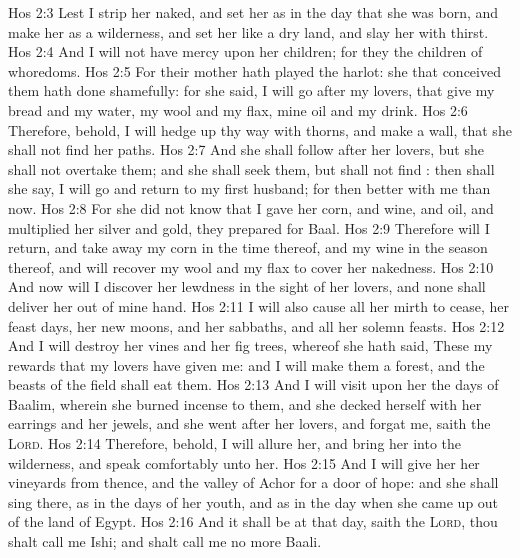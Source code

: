 \vs Hos 2:3 Lest I strip her naked, and set her as in the day that she was born, and make her as a wilderness, and set her like a dry land, and slay her with thirst.
\vs Hos 2:4 And I will not have mercy upon her children; for they  the children of whoredoms.
\vs Hos 2:5 For their mother hath played the harlot: she that conceived them hath done shamefully: for she said, I will go after my lovers, that give  my bread and my water, my wool and my flax, mine oil and my drink.
\vs Hos 2:6 Therefore, behold, I will hedge up thy way with thorns, and make a wall, that she shall not find her paths.
\vs Hos 2:7 And she shall follow after her lovers, but she shall not overtake them; and she shall seek them, but shall not find : then shall she say, I will go and return to my first husband; for then  better with me than now.
\vs Hos 2:8 For she did not know that I gave her corn, and wine, and oil, and multiplied her silver and gold,  they prepared for Baal.
\vs Hos 2:9 Therefore will I return, and take away my corn in the time thereof, and my wine in the season thereof, and will recover my wool and my flax  to cover her nakedness.
\vs Hos 2:10 And now will I discover her lewdness in the sight of her lovers, and none shall deliver her out of mine hand.
\vs Hos 2:11 I will also cause all her mirth to cease, her feast days, her new moons, and her sabbaths, and all her solemn feasts.
\vs Hos 2:12 And I will destroy her vines and her fig trees, whereof she hath said, These  my rewards that my lovers have given me: and I will make them a forest, and the beasts of the field shall eat them.
\vs Hos 2:13 And I will visit upon her the days of Baalim, wherein she burned incense to them, and she decked herself with her earrings and her jewels, and she went after her lovers, and forgat me, saith the \textsc{Lord}.
\vs Hos 2:14 Therefore, behold, I will allure her, and bring her into the wilderness, and speak comfortably unto her.
\vs Hos 2:15 And I will give her her vineyards from thence, and the valley of Achor for a door of hope: and she shall sing there, as in the days of her youth, and as in the day when she came up out of the land of Egypt.
\vs Hos 2:16 And it shall be at that day, saith the \textsc{Lord},  thou shalt call me Ishi; and shalt call me no more Baali.
